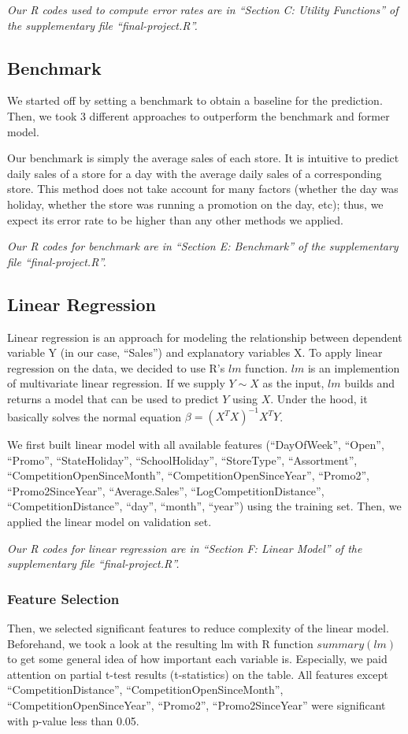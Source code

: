 \documentclass[letterpaper,twocolumn,11pt]{article}
\begin{document}
\textit{Our R codes used to compute error rates are in ``Section C: Utility Functions'' of the supplementary file ``final-project.R''.}

\subsection{Benchmark}
We started off by setting a benchmark to obtain a baseline for the prediction. Then, we took 3 different approaches to outperform the benchmark and former model.

Our benchmark is simply the average sales of each store. It is intuitive to predict daily sales of a store for a day with the average daily sales of a corresponding store. This method does not take account for many factors (whether the day was holiday, whether the store was running a promotion on the day, etc); thus, we expect its error rate to be higher than any other methods we applied.

\textit{Our R codes for benchmark are in ``Section E: Benchmark'' of the supplementary file ``final-project.R''.}

\subsection{Linear Regression}
Linear regression is an approach for modeling the relationship between dependent variable Y (in our case, ``Sales'') and explanatory variables X. To apply linear regression on the data, we decided to use R's $lm$ function. $lm$ is an implemention of multivariate linear regression. If we supply $Y \sim X$ as the input, $lm$ builds and returns a model that can be used to predict $Y$ using $X$. Under the hood, it basically solves the normal equation $\beta = (X^T X)^{-1} X^T Y$.

We first built linear model with all available features (``DayOfWeek'', ``Open'', ``Promo'', ``StateHoliday'', ``SchoolHoliday'', ``StoreType'', ``Assortment'', ``CompetitionOpenSinceMonth'', ``CompetitionOpenSinceYear'', ``Promo2'', ``Promo2SinceYear'', ``Average.Sales'', ``LogCompetitionDistance'', ``CompetitionDistance'', ``day'', ``month'', ``year'') using the training set. Then, we applied the linear model on validation set.

\textit{Our R codes for linear regression are in ``Section F: Linear Model'' of the supplementary file ``final-project.R''.}

\subsubsection{Feature Selection}
Then, we selected significant features to reduce complexity of the linear model. Beforehand, we took a look at the resulting lm with R function $summary(lm)$ to get some general idea of how important each variable is. Especially, we paid attention on partial t-test results (t-statistics) on the table. All features except ``CompetitionDistance'', ``CompetitionOpenSinceMonth'', ``CompetitionOpenSinceYear'', ``Promo2'', ``Promo2SinceYear'' were significant with p-value less than 0.05.
\end{document}
